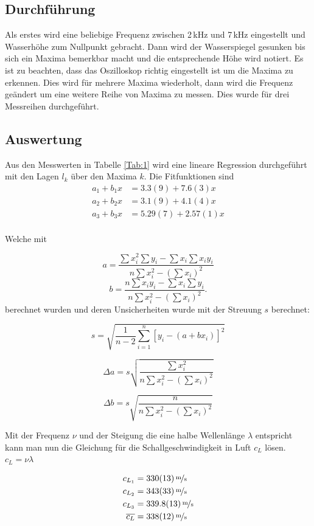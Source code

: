 \documentclass[11pt,a4paper]{article}
\begin{document}
\subsection{Durchführung}

Als erstes wird eine beliebige Frequenz zwischen 2\,kHz und 7\,kHz eingestellt und Wasserhöhe zum Nullpunkt gebracht. Dann wird der Wasserspiegel gesunken bis sich ein Maxima bemerkbar macht und die entsprechende Höhe wird notiert. Es ist zu beachten, dass das Oszilloskop richtig eingestellt ist um die Maxima zu erkennen. Dies wird für mehrere Maxima wiederholt, dann wird die Frequenz geändert um eine weitere Reihe von Maxima zu messen. Dies wurde für drei Messreihen durchgeführt. 

\subsection{Auswertung}

Aus den Messwerten in Tabelle \ref{Tab:1} wird eine lineare Regression durchgeführt mit den Lagen $l_k$ über den Maxima $k$. Die Fitfunktionen sind 
\begin{align*}
	a_1 + b_1 x &= 3.3(9) + 7.6(3)x\\
	a_2 + b_2 x &= 3.1(9) + 4.1(4)x\\
	a_3 + b_3 x &= 5.29(7) + 2.57(1)x\\
\end{align*}

Welche mit

$$a=\frac{\sum x_i^2\sum y_i-\sum x_i\sum x_iy_i}{n\sum x_i^2-(\sum x_i)^2}$$
$$b=\frac{n\sum x_iy_i-\sum x_i\sum y_i}{n\sum x_i^2-(\sum x_i)^2}.$$
berechnet wurden und deren Unsicherheiten wurde mit der Streuung $s$ berechnet:

$$s =\sqrt{\frac{1}{n-2}\sum^n_{i=1}[y_i-(a+bx_i)]^2}$$

$$\Delta a=s\sqrt{\frac{\sum x_i^2}{n\sum x_i^2-(\sum x_i)^2}}$$

$$\Delta b=s\sqrt{\frac{n}{n\sum x_i^2-(\sum x_i)^2}}$$

Mit der Frequenz $\nu$ und der Steigung die eine halbe Wellenlänge $\lambda$ entspricht kann man nun die Gleichung für die Schallgeschwindigkeit in Luft $c_L$ lösen. $c_L = \nu \lambda$ 

\begin{align*}
	c_{L_1} &= 330(13)\, \nicefrac{\textrm{m}}{\textrm{s}}\\
	c_{L_2} &= 343(33)\, \nicefrac{\textrm{m}}{\textrm{s}}\\
	c_{L_3} &= 339.8(13)\, \nicefrac{\textrm{m}}{\textrm{s}}\\
	\overline{c_L} &= 338(12)\, \nicefrac{\textrm{m}}{\textrm{s}}
\end{align*}
\end{document}
